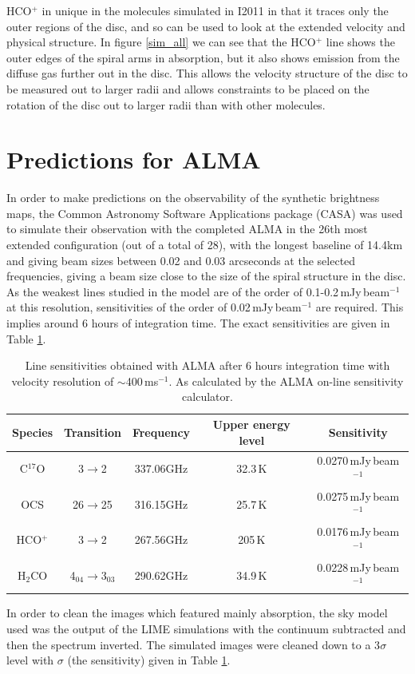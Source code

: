 \documentclass[useAMS,usenatbib]{mn2e}
\begin{document}
HCO$^+$ in unique in the molecules simulated in I2011 in that it traces only the outer regions of the disc, and so can be used to look at the extended velocity and physical structure. In figure \ref{sim_all} we can see that the HCO$^+$ line shows the outer edges of the spiral arms in absorption, but it also shows emission from the diffuse gas further out in the disc. This allows the velocity structure of the disc to be measured out to larger radii and allows constraints to be placed on the rotation of the disc out to larger radii than with other molecules. 


\section{Predictions for ALMA} \label{sec:alma_predictions}

In order to make predictions on the observability of the synthetic brightness maps, the Common Astronomy Software Applications package (CASA) was used to simulate their observation with the completed ALMA in the 26th most extended configuration (out of a total of 28), with the longest baseline of 14.4km and giving beam sizes between 0.02 and 0.03 arcseconds at the selected frequencies, giving a beam size close to the size of the spiral structure in the disc. As the weakest lines studied in the model are of the order of 0.1-0.2$\,$mJy$\,$beam$^{-1}$ at this resolution, sensitivities of the order of 0.02$\,$mJy$\,$beam$^{-1}$ are required. This implies around 6 hours of integration time. The exact sensitivities are given in Table \ref{sigmas}.
\begin{table}
  \centering
  \begin{minipage}{80mm}
    \caption{Line sensitivities obtained with ALMA after 6 hours integration time with velocity resolution of $\sim$400$\,$ms$^{-1}$. As calculated by the ALMA on-line sensitivity calculator.}
    \label{sigmas}
    \begin{tabular}{c||c|c|c|c}
      \hline
      Species & Transition & Frequency & Upper energy level & Sensitivity\\
      \hline
      C$^{17}$O & 3$\rightarrow$2 & 337.06GHz & 32.3$\,$K & 0.0270$\,$mJy$\,$beam$^{-1}$ \\
      OCS & 26$\rightarrow$25 & 316.15GHz & 25.7$\,$K & 0.0275$\,$mJy$\,$beam$^{-1}$ \\
      HCO$^+$ & 3$\rightarrow$2 & 267.56GHz & 205$\,$K & 0.0176$\,$mJy$\,$beam$^{-1}$ \\
      H$_2$CO & 4$_{04}\rightarrow$3$_{03}$ &  290.62GHz & 34.9$\,$K & 0.0228$\,$mJy$\,$beam$^{-1}$ \\
      \hline
    \end{tabular}
  \end{minipage}
\end{table}
In order to clean the images which featured mainly absorption, the sky model used was the output of the LIME simulations with the continuum subtracted and then the spectrum inverted. The simulated images were cleaned down to a 3$\sigma$ level with $\sigma$ (the sensitivity) given in Table \ref{sigmas}.\smallskip
\end{document}
